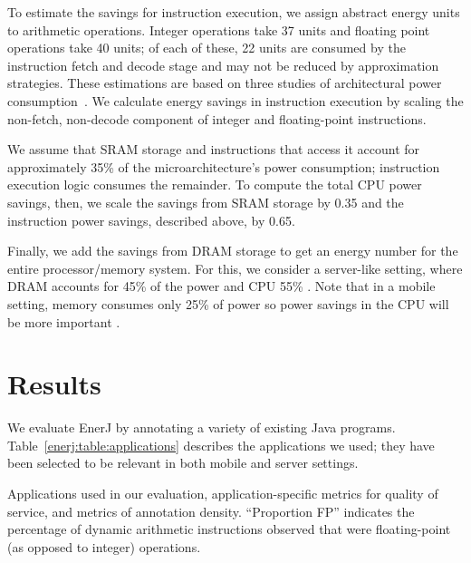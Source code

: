 To estimate the savings for instruction execution, we assign abstract energy
units to arithmetic operations. Integer operations take 37 units and floating point
operations take 40 units; of each of these, 22 units are consumed by the
instruction fetch and decode stage and may not be reduced by approximation
strategies. These estimations are based on three studies of architectural
power consumption~\cite{mcpat,burger2003,wattch}.
We calculate energy savings in instruction execution by scaling the
non-fetch, non-decode component of integer and floating-point instructions.

We assume that SRAM storage and instructions that access it account
for approximately 35\% of the microarchitecture's power consumption;
instruction execution logic consumes the remainder. To compute the
total CPU power savings, then, we scale the savings from SRAM storage
by 0.35 and the instruction power savings, described above, by 0.65.

Finally, we add the savings from DRAM storage to get an energy number for the
entire processor/memory system. For this, we consider a server-like setting,
where DRAM accounts for 45\% of the power and CPU 55\% \cite{googlepower}. Note
that in a mobile setting, memory consumes only 25\% of power so power savings in
the CPU will be more important \cite{carroll2010}.

\section{Results}
\label{enerj:sec:res}

We evaluate EnerJ by annotating a variety of existing Java
programs. Table~\ref{enerj:table:applications} describes the applications we
used; they have been selected to be relevant in both mobile and server
settings. %

\begin{table}
\small
\begin{center}

\vspace{-1ex}
\end{center}
\caption{Applications used in our evaluation,
application-specific metrics for quality of service, and
metrics of annotation density. ``Proportion FP''
indicates the percentage of dynamic arithmetic instructions observed that were
floating-point (as opposed to integer) operations.
}
\label{enerj:table:applications}
\end{table}

